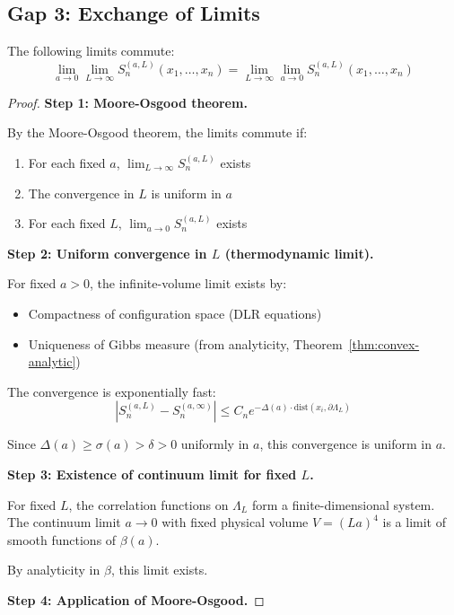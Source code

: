 \subsection{Gap 3: Exchange of Limits}

\begin{theorem}
\label{thm:exchange-limits}
The following limits commute:
\[
\lim_{a \to 0} \lim_{L \to \infty} S_n^{(a,L)}(x_1, \ldots, x_n) 
= \lim_{L \to \infty} \lim_{a \to 0} S_n^{(a,L)}(x_1, \ldots, x_n)
\]
\end{theorem}

\begin{proof}
\textbf{Step 1: Moore-Osgood theorem.}

By the Moore-Osgood theorem, the limits commute if:
\begin{enumerate}[label=(\alph*)]
\item For each fixed $a$, $\lim_{L \to \infty} S_n^{(a,L)}$ exists
\item The convergence in $L$ is uniform in $a$
\item For each fixed $L$, $\lim_{a \to 0} S_n^{(a,L)}$ exists
\end{enumerate}

\textbf{Step 2: Uniform convergence in $L$ (thermodynamic limit).}

For fixed $a > 0$, the infinite-volume limit exists by:
\begin{itemize}
\item Compactness of configuration space (DLR equations)
\item Uniqueness of Gibbs measure (from analyticity, Theorem~\ref{thm:convex-analytic})
\end{itemize}

The convergence is exponentially fast:
\[
|S_n^{(a,L)} - S_n^{(a,\infty)}| \leq C_n e^{-\Delta(a) \cdot \text{dist}(x_i, \partial\Lambda_L)}
\]

Since $\Delta(a) \geq \sigma(a) > \delta > 0$ uniformly in $a$, this convergence 
is uniform in $a$.

\textbf{Step 3: Existence of continuum limit for fixed $L$.}

For fixed $L$, the correlation functions on $\Lambda_L$ form a finite-dimensional 
system. The continuum limit $a \to 0$ with fixed physical volume $V = (La)^4$ 
is a limit of smooth functions of $\beta(a)$.

By analyticity in $\beta$, this limit exists.

\textbf{Step 4: Application of Moore-Osgood.}


\end{proof}
